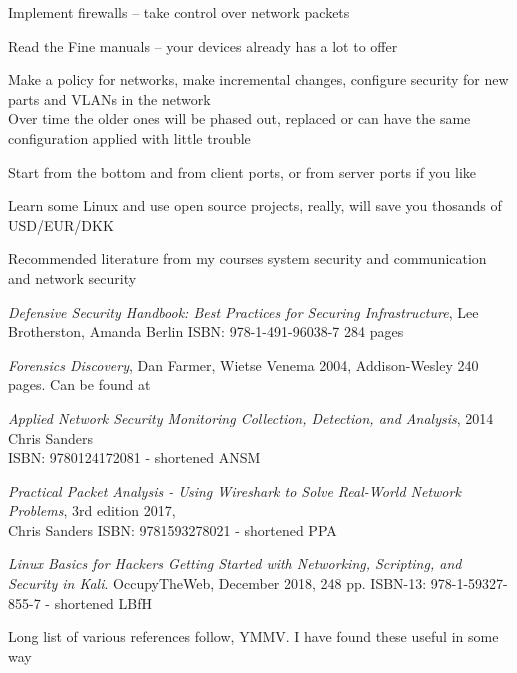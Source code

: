 \documentclass[Screen16to9,17pt]{foils}
\begin{document}


\begin{list2}
\item Implement firewalls -- take control over network packets
\item Read the Fine manuals -- your devices already has a lot to offer
\item Make a policy for networks, make incremental changes, configure security for new parts and VLANs in the network\\
Over time the older ones will be phased out, replaced or can have the same configuration applied with little trouble
\item Start from the bottom and from client ports, or from server ports if you like
\item Learn some Linux and use open source projects, really, will save you thosands of USD/EUR/DKK
\end{list2}


\myquestionspage

Recommended literature from my courses system security and communication and network security

\begin{list2}
\item \emph{Defensive Security Handbook: Best Practices for Securing Infrastructure}, Lee Brotherston, Amanda Berlin ISBN: 978-1-491-96038-7 284 pages
\item \emph{Forensics Discovery}, Dan Farmer, Wietse Venema 2004, Addison-Wesley 240 pages. Can be found at 
\item \emph{Applied Network Security Monitoring Collection, Detection, and Analysis}, 2014 Chris Sanders \\
ISBN: 9780124172081 - shortened ANSM
\item \emph{Practical Packet Analysis - Using Wireshark to Solve Real-World Network Problems}, 3rd edition 2017, \\
Chris Sanders ISBN: 9781593278021 - shortened PPA
\item \emph{Linux Basics for Hackers Getting Started with Networking, Scripting, and Security in Kali}. OccupyTheWeb, December 2018, 248 pp. ISBN-13: 978-1-59327-855-7 - shortened LBfH
\end{list2}

\label{resources}
Long list of various references follow, YMMV. I have found these useful in some way
\end{document}
